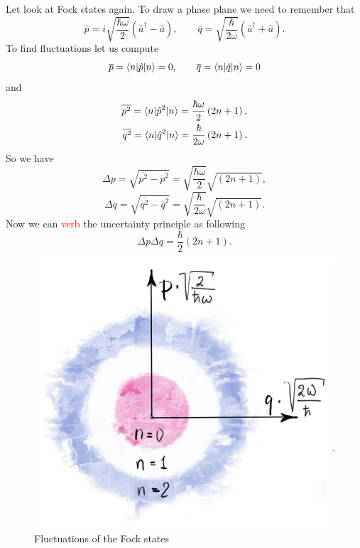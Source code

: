 Let look at Fock states again. To draw a phase plane we need to remember that
\begin{equation}
	\hat{p} = i \sqrt{\frac{\hbar \omega}{2}} \left( \hat{a}^{\dagger} - \hat{a} \right), \qquad \hat{q} = \sqrt{\frac{\hbar}{2 \omega}}\left( \hat{a}^{\dagger} + \hat{a} \right).
\end{equation}
To find fluctuations let us compute
\begin{equation}
	\overline{p} = \langle n\rvert \hat{p} \lvert n\rangle = 0, \qquad \overline{q} = \langle n\rvert \hat{q} \lvert n\rangle = 0
\end{equation}
and
\begin{eqnarray}
	\overline{p^2} = \langle n\rvert \hat{p}^2 \lvert n\rangle = \frac{\hbar \omega}{2} \left( 2n+1 \right), \\
	\overline{q^2} = \langle n\rvert \hat{q}^2 \lvert n\rangle = \frac{\hbar}{2 \omega} \left( 2n+1 \right).
\end{eqnarray}
So we have
\begin{equation}
	\Delta p = \sqrt{\overline{p^2} - \overline{p}^2} = \sqrt{\frac{\hbar \omega}{2}} \sqrt{\left( 2n+1 \right)},
\end{equation}
\begin{equation}
	\Delta q = \sqrt{\overline{q^2} - \overline{q}^2} = \sqrt{\frac{\hbar }{2\omega}} \sqrt{\left( 2n+1 \right)}.
\end{equation}
Now we can {\textcolor{red}{verb}} the uncertainty principle as following
\begin{equation}
	\Delta p \Delta q = \frac{\hbar}{2} \left(2n+1\right).
\end{equation}

\begin{figure}
	\centering
	\includegraphics[width=0.4\linewidth]{fig/L2/fluc2}
	\caption{Fluctuations of the Fock states}
	\label{fig:fluc}
\end{figure}

